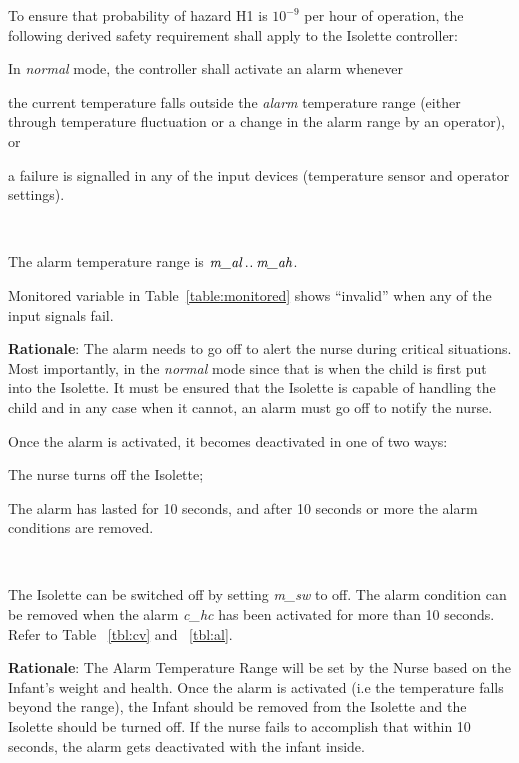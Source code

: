 \documentclass[fontsize=12pt,paper=letter,twoside]{scrartcl}
\begin{document}
\noindent To ensure that probability of hazard H1 is $10^{-9}$ per hour of operation, the following derived safety requirement shall apply to the Isolette controller: 

\rdescription
{In \emph{normal} mode, the controller shall activate an alarm whenever 

\begin{mylist}
\item the current temperature falls outside the \emph{alarm} temperature range (either through temperature fluctuation or a change in the alarm range by an operator), or
\item a failure is signalled in any of the input devices (temperature sensor and operator settings).
\end{mylist}~}
{The alarm temperature range is $\textit{m\_al}\mathbin{.\mkern1mu.}\textit{m\_ah}$.

Monitored variable  
in Table~\ref{table:monitored} 
shows ``invalid'' when any of the input signals fail.}
\label{R3}

\smallskip
\noindent \textbf{Rationale}: The alarm needs to go off to alert the nurse during critical situations. Most importantly, in the \emph{normal} mode since that is when the child is first put into the Isolette. It must be ensured that the Isolette is capable of handling the child and in any case when it cannot, an alarm must go off to notify the nurse.

\rdescription
{Once the alarm is activated, it becomes deactivated in one of two ways:
\begin{mylist}
\item The nurse turns off the Isolette;
\item The alarm has lasted for 10 seconds, and after 10 seconds or more the alarm conditions are removed.
\end{mylist}~\\}
{The Isolette can be switched off by setting \emph{m\_sw} to off. The alarm condition can be removed when the alarm \emph{c\_hc} has been activated for more than 10 seconds. Refer to Table  ~\ref{tbl:cv} and ~\ref{tbl:al}.}
\label{R4}

\smallskip
\noindent \textbf{Rationale}: The Alarm Temperature Range will be set by the Nurse based on the Infant’s weight and health. Once the alarm is activated (i.e the temperature falls beyond the range), the Infant should be removed from the Isolette and the Isolette should be turned off. If the nurse fails to accomplish that within 10 seconds, the alarm gets deactivated with the infant inside.
\end{document}
